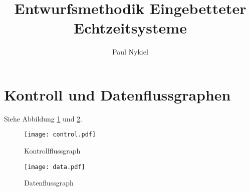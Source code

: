 \documentclass[DIN, pagenumber=false, fontsize=11pt, parskip=half]{scrartcl}
\title{Entwurfsmethodik Eingebetteter Echtzeitsysteme}
\author{Paul Nykiel}
\begin{document}
    \maketitle
    \section{Kontroll und Datenflussgraphen}
    Siehe Abbildung \ref{fig:control} und \ref{fig:data}.
    \begin{figure}[h]
        \centering
        \texttt{[image: control.pdf]}
        \caption{Kontrollflussgraph}
        \label{fig:control}
    \end{figure}
    \begin{figure}[h]
        \centering
        \texttt{[image: data.pdf]}
        \caption{Datenflussgraph}
        \label{fig:data}
    \end{figure}
        
\end{document}
